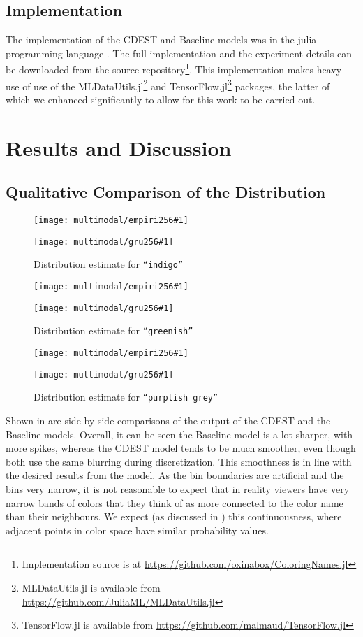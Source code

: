 \documentclass[11pt,letterpaper, twocolumn]{article}
\newcommand{\parencite}{\citep}
\begin{document}
\subsection{Implementation}
The implementation of the CDEST and Baseline models was in the julia programming language \parencite{Julia}.
The full implementation and the experiment details can be downloaded from the source repository\footnote{Implementation source is at \url{https://github.com/oxinabox/ColoringNames.jl}}.
This implementation makes heavy use of use of the MLDataUtils.jl\footnote{MLDataUtils.jl is available from \url{https://github.com/JuliaML/MLDataUtils.jl}} and TensorFlow.jl\footnote{TensorFlow.jl is available from \url{https://github.com/malmaud/TensorFlow.jl}} packages, the latter of which we enhanced significantly to allow for this work to be carried out.


\section{Results and Discussion}\label{sec:results-and-discussion}
\subsection{Qualitative Comparison of the Distribution}\label{resultsdistributions}

\newcommand{\multimodalfig}[2]{
	\begin{figure}
		\texttt{[image: multimodal/empiri256\#1]}
		
		\vspace{3mm}
		
		\texttt{[image: multimodal/gru256\#1]}	
		\caption{\label{fig#1} Distribution estimate for \mbox{\texttt{``#2''}}}
	\end{figure}
}

\multimodalfig{indigo}{indigo}
\multimodalfig{greenish}{greenish}
\multimodalfig{purplishgrey}{purplish grey}


Shown in  are side-by-side comparisons of the output of the CDEST and the Baseline models.
Overall, it can be seen the Baseline model is a lot sharper, with more spikes,
whereas the CDEST model tends to be much smoother, even though both use the same blurring during discretization.
This smoothness is in line with the desired results from the model.
As the bin boundaries are artificial and the bins very narrow, it is not reasonable to expect that in reality viewers have very narrow bands of colors that they think of as more connected to the color name than their neighbours.
We expect  (as discussed in ) this continuousness, where adjacent points in color space have similar probability values.
\end{document}
